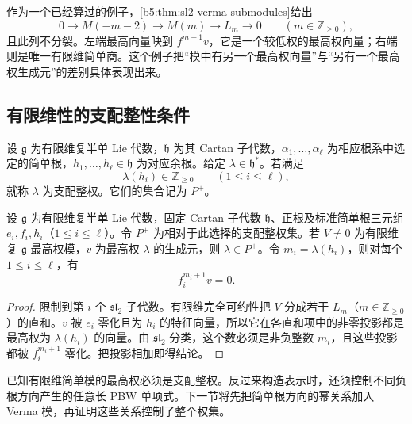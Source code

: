 \ProseParagraphBreak
作为一个已经算过的例子，\cref{b5:thm:sl2-verma-submodules}给出
\[
	0\longrightarrow M(-m-2)\longrightarrow M(m)\longrightarrow L_m\longrightarrow0 \qquad(m\in\mathbb Z_{\ge0}),
\]
且此列不分裂。左端最高向量映到 \(f^{m+1}v\)，它是一个较低权的最高权向量；右端则是唯一有限维简单商。这个例子把“模中有另一个最高权向量”与“另有一个最高权生成元”的差别具体表现出来。

\subsection{有限维性的支配整性条件}
\label{b5:subsec:1803:03}

\begin{definition}\label{b5:def:dominant-integral-weight}
	设 \(\mathfrak g\) 为有限维复半单 Lie 代数，\(\mathfrak h\) 为其 Cartan 子代数，\(\alpha_1,\ldots,\alpha_\ell\) 为相应根系中选定的简单根，\(h_1,\ldots,h_\ell\in\mathfrak h\) 为对应余根。给定 \(\lambda\in\mathfrak h^*\)。若满足
	\[
		\lambda(h_i)\in\mathbb Z_{\ge0}\qquad(1\le i\le\ell),
	\]
	就称 \(\lambda\) 为支配整权。它们的集合记为 \(P^+\)。
\end{definition}

\begin{proposition}\label{b5:prop:finite-highest-dominant}
	设 \(\mathfrak g\) 为有限维复半单 Lie 代数，固定 Cartan 子代数 \(\mathfrak h\)、正根及标准简单根三元组 \(e_i,f_i,h_i\)（\(1\le i\le\ell\)）。令 \(P^+\) 为相对于此选择的支配整权集。若 \(V\ne0\) 为有限维复 \(\mathfrak g\) 最高权模，\(v\) 为最高权 \(\lambda\) 的生成元，则 \(\lambda\in P^+\)。令 \(m_i=\lambda(h_i)\)，则对每个 \(1\le i\le\ell\)，有
	\[
		f_i^{m_i+1}v=0.
	\]
\end{proposition}
\begin{proof}
	限制到第 \(i\) 个 \(\mathfrak{sl}_2\) 子代数。有限维完全可约性把 \(V\) 分成若干 \(L_m\)（\(m\in\mathbb Z_{\ge0}\)）的直和。\(v\) 被 \(e_i\) 零化且为 \(h_i\) 的特征向量，所以它在各直和项中的非零投影都是最高权为 \(\lambda(h_i)\) 的向量。由 \(\mathfrak{sl}_2\) 分类，这个数必须是非负整数 \(m_i\)，且这些投影都被 \(f_i^{m_i+1}\) 零化。把投影相加即得结论。
\end{proof}

已知有限维简单模的最高权必须是支配整权。反过来构造表示时，还须控制不同负根方向产生的任意长 PBW 单项式。下一节将先把简单根方向的幂关系加入 Verma 模，再证明这些关系控制了整个权集。

